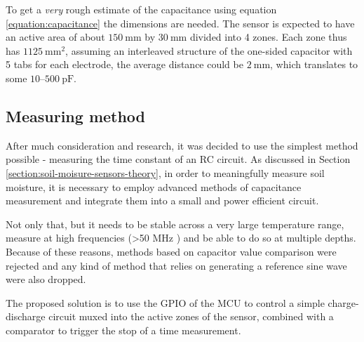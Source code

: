 To get a \emph{very} rough estimate of the capacitance using equation \ref{equation:capacitance} the dimensions are needed. The sensor is expected to have an active area of about $150~\mathrm{mm}$ by $30~\mathrm{mm}$ divided into 4 zones. Each zone thus has $1125~\mathrm{mm^2}$, assuming an interleaved structure of the one-sided capacitor with 5 tabs for each electrode, the average distance could be $2~\mathrm{mm}$, which translates to some $10\text{--}500~\mathrm{pF}$. %

\subsection{Measuring method}
After much consideration and research, it was decided to use the simplest method possible - measuring the time constant of an RC circuit. As discussed in Section \ref{section:soil-moisure-sensors-theory}, in order to meaningfully measure soil moisture, it is necessary to employ advanced methods of capacitance measurement and integrate them into a small and power efficient circuit.

Not only that, but it needs to be stable across a very large temperature range, measure at high frequencies (>50 MHz \cite{meter_group_soil_2023}) and be able to do so at multiple depths. Because of these reasons, methods based on capacitor value comparison were rejected and any kind of method that relies on generating a reference sine wave were also dropped.

The proposed solution is to use the GPIO of the MCU to control a simple charge-discharge circuit muxed into the active zones of the sensor, combined with a comparator to trigger the stop of a time measurement.

